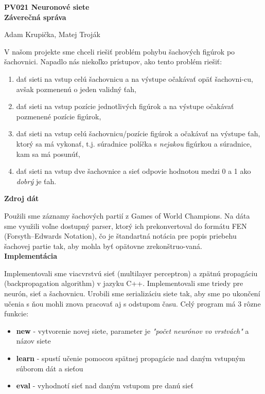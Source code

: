 \documentclass[12pt]{article}
\newcommand{\mysection}[1]{{\newpage\centering\Large\textbf{#1}\\}\normalsize\vspace{0.1cm}}
\newcommand{\mysmallsection}[1]{\vspace{0.5cm}{\centering\large\textbf{#1}\\}\normalsize\vspace{0.5cm}}
\begin{document}
\mysection{PV021 Neuronové siete \\ Záverečná správa}
\begin{center}
Adam Krupička, Matej Troják
\end{center}

\mysmallsection{Problém šachového ťahu}
V našom projekte sme chceli riešiť problém pohybu šachových figúrok po šachovnici. Napadlo nás niekoľko prístupov, ako tento problém riešiť:

\begin{enumerate}
\item dať sieti na vstup celú šachovnicu a na výstupe očakávať opäť šachovni-cu, avšak pozmenenú o jeden validný ťah,
\item dať sieti na vstup pozície jednotlivých figúrok a na výstupe očakávať pozmenené pozície figúrok,
\item dať sieti na vstup celú šachovnicu/pozície figúrok a očakávať na výstupe ťah, ktorý sa má vykonať, t.j. súradnice políčka s \textit{nejakou} figúrkou a súradnice, kam sa má posunúť,
\item dať sieti na vstup dve šachovnice a sieť odpovie hodnotou medzi 0 a 1 ako \textit{dobrý} je ťah.
\end{enumerate}

{\centering\textbf{Zdroj dát}\\}

Použili sme záznamy šachových partií z Games of World Champions\footnotemark[1]. Na dáta sme využili voľne dostupný parser, ktorý ich prekonvertoval do formátu FEN (Forsyth–Edwards Notation), čo je štandartná notácia pre popis priebehu šachovej partie tak, aby mohla byť opätovne zrekonštruo-vaná. \\

{\centering\textbf{Implementácia}\\}

Implementovali sme viacvrstvú sieť (multilayer perceptron) a zpätnú propagáciu (backpropagation algorithm) v jazyku C++. Implementovali sme triedy pre neurón, sieť a šachovnicu. Urobili sme serializáciu siete tak, aby sme po ukončení učenia s ňou mohli znova pracovať aj s odstupom času. Celý program má 3 rôzne funkcie:

\begin{itemize}
\item \textbf{new} - vytvorenie novej siete, parameter je \textit{"počet neurónov vo vrstvách"} a názov siete
\item \textbf{learn} - spustí učenie pomocou spätnej propagácie nad daným vstupným súborom dát a sieťou
\item \textbf{eval} - vyhodnotí sieť nad daným vstupom pre danú sieť
\end{itemize}
\end{document}
